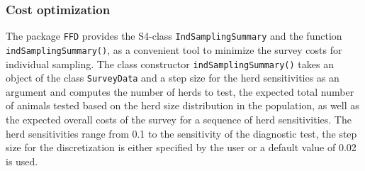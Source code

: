 \documentclass[nojss]{jss}
\begin{document}
\subsubsection{Cost optimization}

The package \texttt{FFD} provides the S4-class \texttt{IndSamplingSummary}   and the function \texttt{indSamplingSummary()},  as a convenient tool to minimize the survey costs for individual sampling. The class constructor \texttt{indSamplingSummary()} takes an object of the class \texttt{SurveyData} and a step size for the herd sensitivities as an argument and computes the number of herds to test, the expected total number of animals tested based on the herd size distribution in the population, as well as the expected overall costs of the survey for a sequence of herd sensitivities. The herd sensitivities range from 0.1 to the sensitivity of the diagnostic test, the step size for the discretization is either specified by the user or a default value of 0.02 is used.
\end{document}
